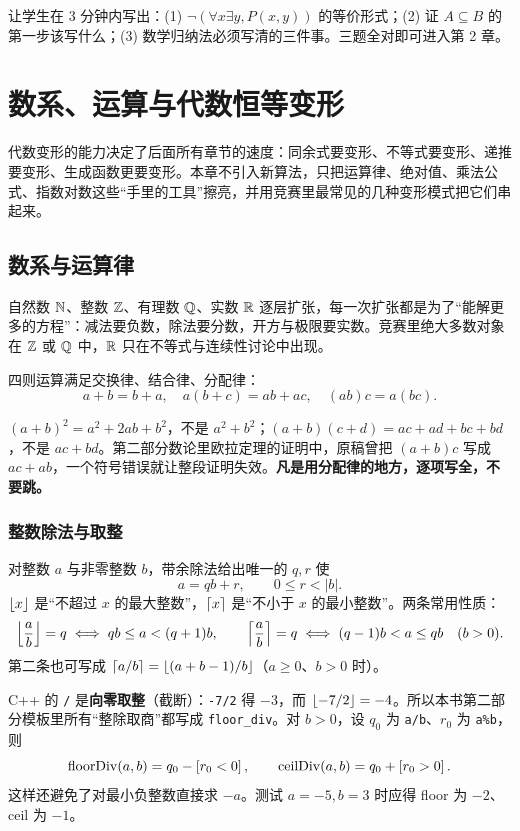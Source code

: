 \begin{teach}[这一章的离堂检查]
让学生在 $3$ 分钟内写出：(1) $\lnot(\forall x\exists y,P(x,y))$ 的等价形式；(2) 证 $A\subseteq B$ 的第一步该写什么；(3) 数学归纳法必须写清的三件事。三题全对即可进入第 2 章。
\end{teach}

\chapter{数系、运算与代数恒等变形}
\begin{chapterintro}[章节导读]
代数变形的能力决定了后面所有章节的速度：同余式要变形、不等式要变形、递推要变形、生成函数更要变形。本章不引入新算法，只把运算律、绝对值、乘法公式、指数对数这些“手里的工具”擦亮，并用竞赛里最常见的几种变形模式把它们串起来。
\end{chapterintro}

\section{数系与运算律}
自然数 $\mathbb N$、整数 $\mathbb Z$、有理数 $\mathbb Q$、实数 $\mathbb R$ 逐层扩张，每一次扩张都是为了“能解更多的方程”：减法要负数，除法要分数，开方与极限要实数。竞赛里绝大多数对象在 $\mathbb Z$ 或 $\mathbb Q$ 中，$\mathbb R$ 只在不等式与连续性讨论中出现。

四则运算满足交换律、结合律、分配律：
\[
a+b=b+a,\quad a(b+c)=ab+ac,\quad (ab)c=a(bc).
\]
\begin{pitfall}[分配律的常见笔误]
$(a+b)^2=a^2+2ab+b^2$，不是 $a^2+b^2$；$(a+b)(c+d)=ac+ad+bc+bd$，不是 $ac+bd$。第二部分数论里欧拉定理的证明中，原稿曾把 $(a+b)c$ 写成 $ac+ab$，一个符号错误就让整段证明失效。\textbf{凡是用分配律的地方，逐项写全，不要跳。}
\end{pitfall}

\subsection{整数除法与取整}
对整数 $a$ 与非零整数 $b$，带余除法给出唯一的 $q,r$ 使
\[
a=qb+r,\qquad 0\le r<|b|.
\]
$\left\lfloor x\right\rfloor$ 是“不超过 $x$ 的最大整数”，$\left\lceil x\right\rceil$ 是“不小于 $x$ 的最小整数”。两条常用性质：
\[
\left\lfloor \frac ab\right\rfloor=q\iff qb\le a<(q+1)b,\qquad
\left\lceil \frac ab\right\rceil=q\iff (q-1)b<a\le qb\quad(b>0).
\]
第二条也可写成 $\left\lceil a/b\right\rceil=\left\lfloor (a+b-1)/b\right\rfloor$（$a\ge0$、$b>0$ 时）。

\begin{pitfall}[C++ 的除法不是向下取整]
C++ 的 \texttt{/} 是\textbf{向零取整}（截断）：\texttt{-7/2} 得 $-3$，而 $\left\lfloor -7/2\right\rfloor=-4$。所以本书第二部分模板里所有“整除取商”都写成 \texttt{floor\_div}。对 $b>0$，设 $q_0$ 为 \texttt{a/b}、$r_0$ 为 \texttt{a\%b}，则
\[
\operatorname{floorDiv}(a,b)=q_0-\left[r_0<0\right],\qquad
\operatorname{ceilDiv}(a,b)=q_0+\left[r_0>0\right].
\]
这样还避免了对最小负整数直接求 $-a$。测试 $a=-5,b=3$ 时应得 floor 为 $-2$、ceil 为 $-1$。
\end{pitfall}

